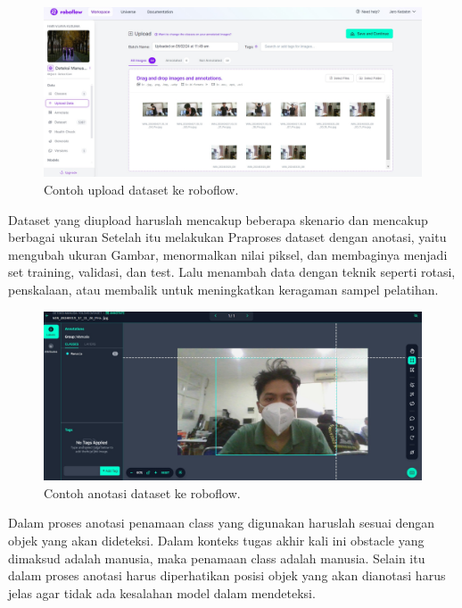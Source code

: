 \begin{figure}[H]
  \centering
  \includegraphics[scale=0.3]{gambar/roboflow upload.jpg}
  \caption{Contoh upload dataset ke roboflow.}
  \label{fig:Mengupload dataset ke roboflow}
\end{figure}

Dataset yang diupload haruslah mencakup beberapa skenario dan mencakup berbagai ukuran Setelah itu melakukan Praproses dataset dengan anotasi, yaitu mengubah ukuran Gambar, menormalkan nilai piksel, dan membaginya menjadi set training, validasi, dan test. Lalu menambah data dengan teknik seperti rotasi, penskalaan, atau membalik untuk meningkatkan keragaman sampel pelatihan.
\begin{figure}[H]
  \centering
  \includegraphics[scale=0.3]{gambar/roboflow anotasi.jpg}
  \caption{Contoh anotasi dataset ke roboflow.}
  \label{fig:Mengupload dataset ke roboflow}
\end{figure}

Dalam proses anotasi penamaan class yang digunakan haruslah sesuai dengan objek yang akan dideteksi. Dalam konteks tugas akhir kali ini obstacle yang dimaksud adalah manusia, maka penamaan class adalah manusia. Selain itu dalam proses anotasi harus diperhatikan posisi objek yang akan dianotasi harus jelas agar tidak ada kesalahan model dalam mendeteksi.

